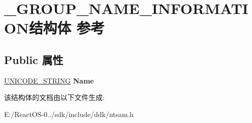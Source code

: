 \hypertarget{struct___g_r_o_u_p___n_a_m_e___i_n_f_o_r_m_a_t_i_o_n}{}\section{\+\_\+\+G\+R\+O\+U\+P\+\_\+\+N\+A\+M\+E\+\_\+\+I\+N\+F\+O\+R\+M\+A\+T\+I\+O\+N结构体 参考}
\label{struct___g_r_o_u_p___n_a_m_e___i_n_f_o_r_m_a_t_i_o_n}
\subsection*{Public 属性}
\begin{DoxyCompactItemize}
\item 
\mbox{\label{struct___g_r_o_u_p___n_a_m_e___i_n_f_o_r_m_a_t_i_o_n_a48cf4c94e8d7cbcaca1fa1a9ec02230d}} 
\hyperlink{struct___u_n_i_c_o_d_e___s_t_r_i_n_g}{U\+N\+I\+C\+O\+D\+E\+\_\+\+S\+T\+R\+I\+NG} {\bfseries Name}
\end{DoxyCompactItemize}


该结构体的文档由以下文件生成\+:\begin{DoxyCompactItemize}
\item 
E\+:/\+React\+O\+S-\/0../sdk/include/ddk/ntsam.\+h\end{DoxyCompactItemize}
